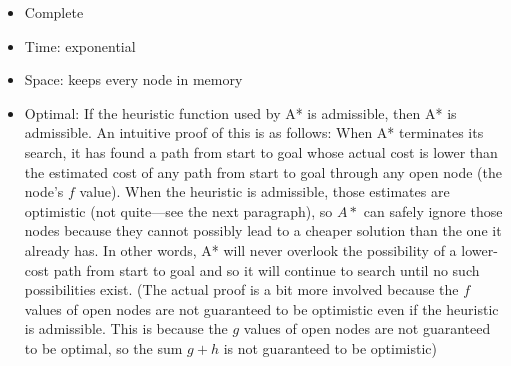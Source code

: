 \begin{itemize}
  \item Complete
  \item Time: exponential
  \item Space: keeps every node in memory
  \item Optimal: If the heuristic function used by A* is
    admissible, then A* is admissible. 
    An intuitive proof of this is as follows: When
    A* terminates its search, it has found a path from start to
    goal whose actual cost is lower than the estimated cost of
    any path from start to goal through any open node (the node's
    $f$ value). 
    When the heuristic is admissible, those estimates are
    optimistic (not quite—see the next paragraph), so $A*$ can
    safely ignore those nodes because they cannot possibly lead
    to a cheaper solution than the one it already has. 
    In other words, A* will never overlook the
    possibility of a lower-cost path from start to goal and so it
    will continue to search until no such possibilities exist.
    (The actual proof is a bit more involved because the
    $f$ values of open nodes are not guaranteed to
    be optimistic even if the heuristic is admissible. This is
    because the $g$ values of open nodes are not guaranteed to be
    optimal, so the sum $g+h$ is not guaranteed to be optimistic)
\end{itemize}

